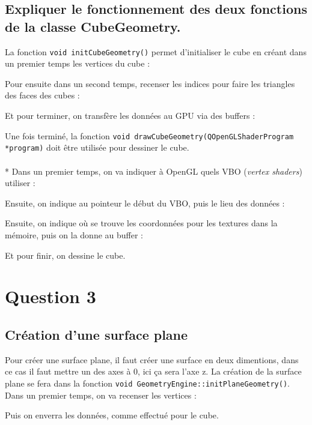 \documentclass[a4paper,11pt]{report}
\begin{document}
	\subsection{Expliquer le fonctionnement des deux fonctions de la classe CubeGeometry.}
	    La fonction {\lstinline{void initCubeGeometry()}} permet d'initialiser le cube en créant dans un premier temps les vertices du cube :
    
    Pour ensuite dans un second temps, recenser les indices pour faire les triangles des faces des cubes :
    
    Et pour terminer, on transfère les données au GPU via des buffers :
    
    Une fois terminé, la fonction {\lstinline{void drawCubeGeometry(QOpenGLShaderProgram *program)}} doit être utilisée pour dessiner le cube.\\ \\*
    Dans un premier temps, on va indiquer à OpenGL quels VBO ({\it{vertex shaders}}) utiliser :
    
    Ensuite, on indique au pointeur le début du VBO, puis le lieu des données :
    
    \pagebreak
    
    Ensuite, on indique où se trouve les coordonnées pour les textures dans la mémoire, puis on la donne au buffer :
    
    
    Et pour finir, on dessine le cube.
    
	
	\pagebreak
	\section{Question 3}
	\subsection{Création d'une surface plane}
	  Pour créer une surface plane, il faut créer une surface en deux dimentions, dans ce cas il faut mettre un des axes à 0, ici ça sera l'axe z. La création de la surface plane se fera dans la fonction \lstinline{void GeometryEngine::initPlaneGeometry()}. Dans un premier temps, on va recenser les vertices :
	  
	  Puis on enverra les données, comme effectué pour le cube.
	  \pagebreak
	  
\end{document}
